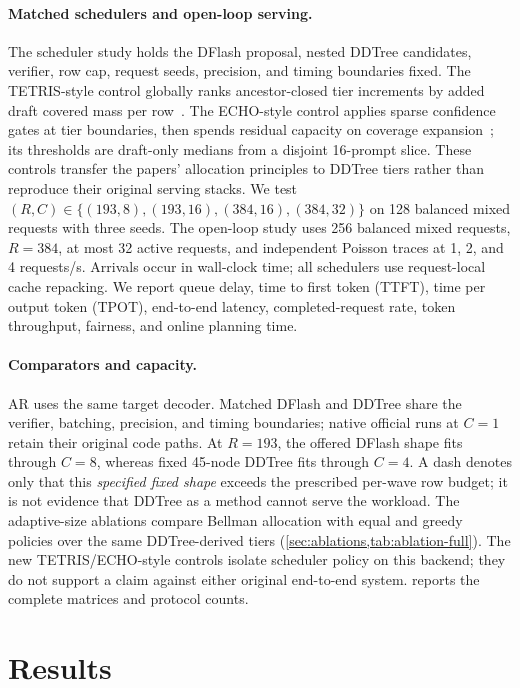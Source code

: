 \documentclass{article}
\begin{document}
\paragraph{Matched schedulers and open-loop serving.}
The scheduler study holds the DFlash proposal, nested DDTree candidates, verifier, row cap, request seeds, precision, and timing boundaries fixed. The TETRIS-style control globally ranks ancestor-closed tier increments by added draft covered mass per row~\citep{wu2025tetris}. The ECHO-style control applies sparse confidence gates at tier boundaries, then spends residual capacity on coverage expansion~\citep{hu2026echo}; its thresholds are draft-only medians from a disjoint 16-prompt slice. These controls transfer the papers' allocation principles to DDTree tiers rather than reproduce their original serving stacks. We test $(R,C)\in\{(193,8),(193,16),(384,16),(384,32)\}$ on 128 balanced mixed requests with three seeds. The open-loop study uses 256 balanced mixed requests, $R=384$, at most 32 active requests, and independent Poisson traces at 1, 2, and 4 requests/s. Arrivals occur in wall-clock time; all schedulers use request-local cache repacking. We report queue delay, time to first token (TTFT), time per output token (TPOT), end-to-end latency, completed-request rate, token throughput, fairness, and online planning time.

\paragraph{Comparators and capacity.}
AR uses the same target decoder. Matched DFlash and DDTree share the verifier, batching, precision, and timing boundaries; native official runs at $C=1$ retain their original code paths. At $R=193$, the offered DFlash shape fits through $C=8$, whereas fixed 45-node DDTree fits through $C=4$. A dash denotes only that this \emph{specified fixed shape} exceeds the prescribed per-wave row budget; it is not evidence that DDTree as a method cannot serve the workload. The adaptive-size ablations compare Bellman allocation with equal and greedy policies over the same DDTree-derived tiers (\cref{sec:ablations,tab:ablation-full}). The new TETRIS/ECHO-style controls isolate scheduler policy on this backend; they do not support a claim against either original end-to-end system.  reports the complete matrices and protocol counts.

\section{Results}
\label{sec:results}
\end{document}
